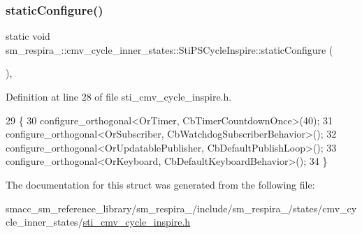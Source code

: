 \subsubsection{\texorpdfstring{static\+Configure()}{staticConfigure()}}
{\footnotesize\ttfamily static void sm\+\_\+respira\+\_\+::cmv\+\_\+cycle\+\_\+inner\+\_\+states\+::\+Sti\+P\+S\+Cycle\+Inspire\+::static\+Configure (\begin{DoxyParamCaption}{ }\end{DoxyParamCaption})\hspace{0.3cm}{\ttfamily [inline]}, {\ttfamily [static]}}



Definition at line 28 of file sti\+\_\+cmv\+\_\+cycle\+\_\+inspire.\+h.


\begin{DoxyCode}
29   \{
30     configure\_orthogonal<OrTimer, CbTimerCountdownOnce>(40);
31     configure\_orthogonal<OrSubscriber, CbWatchdogSubscriberBehavior>();
32     configure\_orthogonal<OrUpdatablePublisher, CbDefaultPublishLoop>();
33     configure\_orthogonal<OrKeyboard, CbDefaultKeyboardBehavior>();
34   \}
\end{DoxyCode}


The documentation for this struct was generated from the following file\+:\begin{DoxyCompactItemize}
\item 
smacc\+\_\+sm\+\_\+reference\+\_\+library/sm\+\_\+respira\+\_/include/sm\+\_\+respira\+\_/states/cmv\+\_\+cycle\+\_\+inner\+\_\+states/\hyperlink{sti__cmv__cycle__inspire_8h}{sti\+\_\+cmv\+\_\+cycle\+\_\+inspire.\+h}\end{DoxyCompactItemize}
